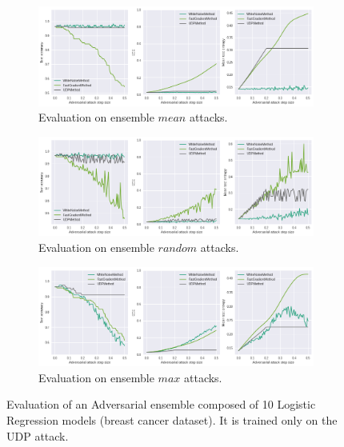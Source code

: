 \begin{figure}[htbp]
    \begin{subfigure}{\textwidth}
      \centering
      \includegraphics[width=\linewidth]{figures/eval/eval_adv_uq_train_ensemble_udp_mean.png}
       \caption{Evaluation on ensemble $mean$ attacks.}
    \end{subfigure}
     \begin{subfigure}{\textwidth}
      \centering
      \includegraphics[width=\linewidth]{figures/eval/eval_adv_uq_train_ensemble_udp_random.png}
       \caption{Evaluation on ensemble $random$ attacks.}
    \end{subfigure}
    \begin{subfigure}{\textwidth}
      \centering
      \includegraphics[width=\linewidth]{figures/eval/eval_adv_uq_train_ensemble_udp_max.png}
      \caption{Evaluation on ensemble $max$ attacks.}
    \end{subfigure}
    \caption{Evaluation of an Adversarial ensemble composed of 10 Logistic Regression models (breast cancer dataset). It is trained only on the UDP attack.}
    \label{fig:adversarial-evaluation-training-ensemble-udp}
\end{figure}


